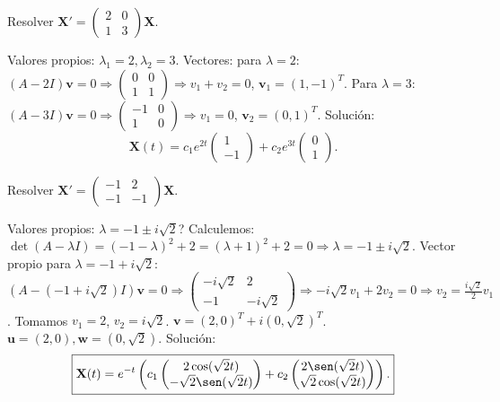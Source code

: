 \begin{prob}
Resolver $\mathbf{X}'=
\begin{pmatrix}
2&0\\
1&3
\end{pmatrix}\mathbf{X}$.
\begin{myproof}
Valores propios: $\lambda_1=2,\lambda_2=3$. Vectores: para $\lambda=2$: $(A-2I)\mathbf{v}=0\Rightarrow
\begin{pmatrix}
0&0\\1&1
\end{pmatrix}\Rightarrow v_1+v_2=0$, $\mathbf{v}_1=(1,-1)^T$. Para $\lambda=3$: $(A-3I)\mathbf{v}=0\Rightarrow
\begin{pmatrix}
-1&0\\1&0
\end{pmatrix}\Rightarrow v_1=0$, $\mathbf{v}_2=(0,1)^T$.
Solución:
\[
\boxed{
\mathbf{X}(t)=c_1 e^{2t}
\begin{pmatrix}
1\\-1
\end{pmatrix}
+c_2 e^{3t}
\begin{pmatrix}
0\\1
\end{pmatrix}.
}
\]
\end{myproof}
\end{prob}

\begin{prob}
Resolver $\mathbf{X}'=
\begin{pmatrix}
-1&2\\
-1&-1
\end{pmatrix}\mathbf{X}$.
\begin{myproof}
Valores propios: $\lambda=-1\pm i\sqrt{2}$? Calculemos: $\det(A-\lambda I)=(-1-\lambda)^2+2=(\lambda+1)^2+2=0\Rightarrow \lambda=-1\pm i\sqrt{2}$.
Vector propio para $\lambda=-1+i\sqrt{2}$: $(A-(-1+i\sqrt{2})I)\mathbf{v}=0\Rightarrow
\begin{pmatrix}
-i\sqrt{2}&2\\
-1&-i\sqrt{2}
\end{pmatrix}\Rightarrow -i\sqrt{2}v_1+2v_2=0\Rightarrow v_2=\frac{i\sqrt{2}}{2}v_1$. Tomamos $v_1=2$, $v_2=i\sqrt{2}$. $\mathbf{v}=(2,0)^T+i(0,\sqrt{2})^T$. $\mathbf{u}=(2,0),\mathbf{w}=(0,\sqrt{2})$.
Solución:
\[
\boxed{
\mathbf{X}(t)=e^{-t}\left(c_1
\begin{pmatrix}
2\cos(\sqrt{2}t)\\
-\sqrt{2}\sen(\sqrt{2}t)
\end{pmatrix}
+c_2
\begin{pmatrix}
2\sen(\sqrt{2}t)\\
\sqrt{2}\cos(\sqrt{2}t)
\end{pmatrix}\right).
}
\]
\end{myproof}
\end{prob}

